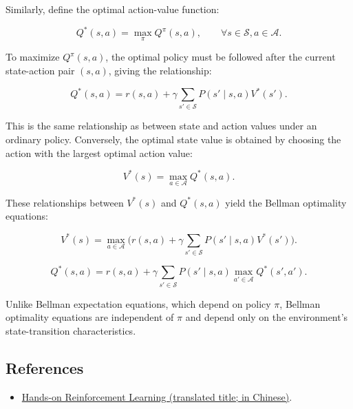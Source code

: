 Similarly, define the optimal action-value function:

\[
Q^{*}(s,a)=\max_{\pi}Q^{\pi}(s,a),\qquad \forall s\in\mathcal{S},a\in\mathcal{A}.
\]

To maximize \(Q^{\pi}(s,a)\), the optimal policy must be followed after the current state-action pair \((s,a)\), giving the relationship:

\[
Q^{*}(s,a)=r(s,a)+\gamma\sum_{s'\in\mathcal{S}}P(s'\mid s,a)V^{*}(s').
\]

This is the same relationship as between state and action values under an ordinary policy. Conversely, the optimal state value is obtained by choosing the action with the largest optimal action value:

\[
V^{*}(s)=\max_{a\in\mathcal{A}}Q^{*}(s,a).
\]

These relationships between \(V^{*}(s)\) and \(Q^{*}(s,a)\) yield the Bellman optimality equations:

\[
V^{*}(s)=\max_{a\in\mathcal{A}}\bigl(r(s,a)+\gamma\sum_{s'\in\mathcal{S}}P(s'\mid s,a)V^{*}(s')\bigr).
\]

\[
Q^{*}(s,a)=r(s,a)+\gamma\sum_{s'\in\mathcal{S}}P(s'\mid s,a)
\max_{a'\in\mathcal{A}}Q^{*}(s',a').
\]

Unlike Bellman expectation equations, which depend on policy \(\pi\), Bellman optimality equations are independent of \(\pi\) and depend only on the environment's state-transition characteristics.

\FloatBarrier
{}
\hypertarget{references-43}{%
\subsection{References}\label{references-43}}

\vspace{0.25em}
\begin{itemize}
\tightlist
\item
  \href{https://hrl.boyuai.com/}{Hands-on Reinforcement Learning (translated title; in Chinese)}.
\end{itemize}

\clearpage

